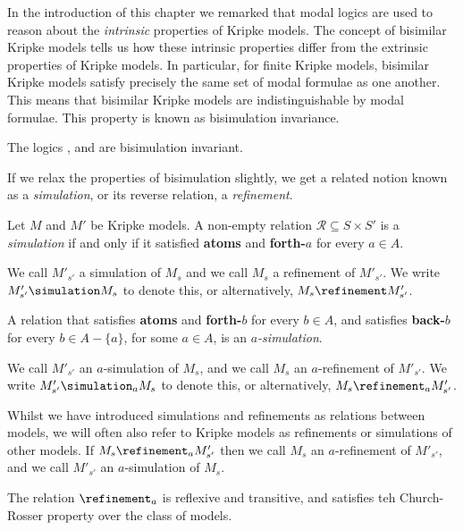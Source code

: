 In the introduction of this chapter we remarked that modal logics are used to
reason about the {\em intrinsic} properties of Kripke models. The concept of
bisimilar Kripke models tells us how these intrinsic properties differ from the
extrinsic properties of Kripke models. In particular, for finite Kripke models,
bisimilar Kripke models satisfy precisely the same set of modal formulae as one
another. This means that bisimilar Kripke models are indistinguishable by modal
formulae. This property is known as bisimulation invariance.

\begin{lemma}
The logics \logicK{}, \logicKD{} and \logicS{} are bisimulation invariant.
\end{lemma}


If we relax the properties of bisimulation slightly, we get a related notion
known as a {\em simulation}, or its reverse relation, a {\em refinement}.

\begin{definition}
Let $M$ and $M'$ be Kripke models. A non-empty relation $\mathcal{R}
\subseteq S \times S'$ is a \textit{simulation} if and only if it satisfied {\bf
atoms} and {\bf forth-$a$} for every $a \in A$.

We call $M'_{s'}$ a simulation of $M_s$ and we call $M_s$ a refinement of
$M'_{s'}$. We write $M'_{s'} \simulation M_s$ to denote this, or alternatively,
$M_s \refinement M'_{s'}$.

A relation that satisfies {\bf atoms} and {\bf forth-$b$} for every $b \in A$,
and satisfies {\bf back-$b$} for every $b \in A - \{a\}$, for some $a \in A$, is
an $a$\textit{-simulation}. 

We call $M'_{s'}$ an $a$-simulation of $M_s$, and we call $M_s$ an
$a$-refinement of $M'_{s'}$. We write $M'_{s'} \simulation_a M_s$ to denote
this, or alternatively, $M_s \refinement_a M'_{s'}$.
\end{definition}

Whilst we have introduced simulations and refinements as relations between
models, we will often also refer to Kripke models as refinements or simulations
of other models. If $M_s \refinement_a M'_{s'}$ then we call $M_s$ an
$a$-refinement of $M'_{s'}$, and we call $M'_{s'}$ an $a$-simulation of $M_s$.

\begin{lemma}
The relation $\refinement_a$ is reflexive and transitive, and satisfies teh
Church-Rosser property over the class of \classK models.
\end{lemma}

